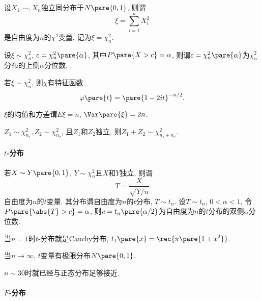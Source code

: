 \documentclass[../Statistics.tex]{subfiles}
\begin{document}
设$X_1,\cdots,X_n$独立同分布于$N\pare{0,1}$, 则谓
\[ \xi = \sum_{i=1}^n X_i^2 \]
是自由度为$n$的$\chi^2$变量, 记为$\xi = \chi_n^2$.
\par
设$\xi \sim \chi_n^2$, $c = \chi_n^2\pare{\alpha}$, 其中$P\pare{X>c}=\alpha$, 则谓$c=\chi_n^2\pare{\alpha}$为$\chi_n^2$分布的上侧$\alpha$分位数.

\begin{corollary}
    \begin{cenum}
        \item 若$\xi\sim\chi_n^2$, 则$\chi$有特征函数
        \[ \varphi\pare{t} = \pare{1-2it}^{-n/2}. \]
        \item $\xi$的均值和方差谓$E\xi = n$, $\Var\pare{\xi} = 2n$.
        \item $Z_1\sim \chi_{n_1}^2, Z_2 \sim \chi_{n_2}^2$, 且$Z_1$和$Z_2$独立, 则$Z_1+Z_2 \sim \chi_{n_1+n_2}^2$.
    \end{cenum}
\end{corollary}


\paragraph{$t$-分布} %
\label{par:t分布}

若$X\sim Y\pare{0,1}$, $Y\sim \chi_n^2$且$X$和$Y$独立, 则谓
\[ T = \frac{X}{\sqrt{Y/n}} \]
自由度为$n$的$t$变量. 其分布谓自由度为$n$的$t$分布, $T \sim t_n$. 设$T\sim t_n$, $0<\alpha<1$, 令$P\pare{\abs{T}>c} = \alpha$, 则$c = t_n\pare{\alpha/2}$为自由度为$n$的$t$分布的双侧$\alpha$分位数.

\begin{corollary}[$t$-分布的性质]
    \begin{cenum}
        \item 当$n=1$时$t$-分布就是Cauchy分布, $\displaystyle t_1\pare{x} = \rec{\pi \pare{1+x^2}}$.
        \item 当$n\rightarrow \infty$, $t$变量有极限分布$N\pare{0,1}$.
    \end{cenum}
\end{corollary}
\begin{remark}
    $n\sim 30$时就已经与正态分布足够接近.
\end{remark}


\paragraph{$F$-分布} %
\label{par:F分布}
\end{document}
